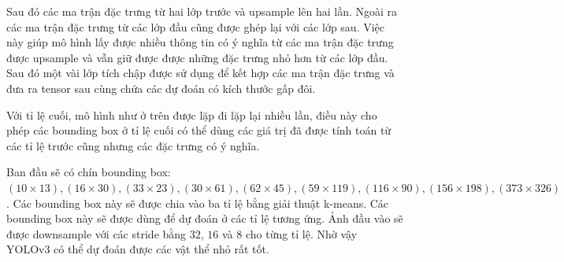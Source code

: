 Sau đó các ma trận đặc trưng từ hai lớp trước và upsample lên hai lần. Ngoài ra các ma trận đặc trưng từ các lớp đầu cũng được ghép lại với các lớp sau. Việc này giúp mô hình lấy được nhiều thông tin có ý nghĩa từ các ma trận đặc trưng được upsample và vẫn giữ được được những đặc trưng nhỏ hơn từ các lớp đầu. Sau đó một vài lớp tích chập được sử dụng để kết hợp các ma trận đặc trưng và đưa ra tensor sau cùng chứa các dự đoán có kích thước gấp đôi.

Với tỉ lệ cuối, mô hình như ở trên được lặp đi lặp lại nhiều lần, điều này cho phép các bounding box ở tỉ lệ cuối có thể dùng các giá trị đã được tính toán từ các tỉ lệ trước cũng nhưng các đặc trưng có ý nghĩa.

Ban đầu sẽ có chín bounding box: $(10 \times 13),(16 \times 30),(33 \times 23),(30 \times 61),(62 \times 45),(59 \times 119),(116 \times 90),(156 \times 198),(373 \times 326)$. Các bounding box này sẽ được chia vào ba tỉ lệ bằng giải thuật k-means. Các bounding box này sẽ được dùng để dự đoán ở các tỉ lệ tương ứng. Ảnh đầu vào sẽ được downsample với các stride bằng $32$, $16$ và $8$ cho từng tỉ lệ. Nhờ vậy YOLOv3 có thể dự đoán được các vật thể nhỏ rất tốt.

